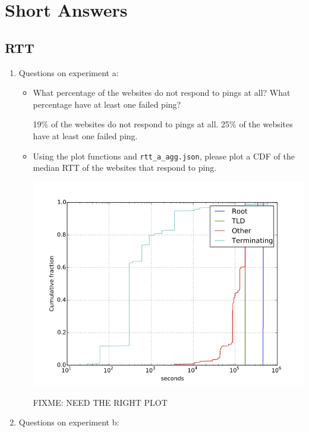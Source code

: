\documentclass[10pt]{article}
\begin{document}
\section*{Short Answers}

\subsection*{RTT}

\begin{enumerate}
\item Questions on experiment a:

\begin{itemize}
\item What percentage of the websites do not respond to pings at all? What percentage have at least one failed ping?

19\% of the websites do not respond to pings at all. 25\% of the websites have at least one failed ping.

\item Using the plot functions and \texttt{rtt\_a\_agg.json}, please plot a CDF of the median RTT of the websites that respond to ping.

\begin{center}
\includegraphics[scale=0.5]{example_cdf_dns_ttl}
\end{center}
FIXME: NEED THE RIGHT PLOT

\end{itemize}

\item Questions on experiment b:


\end{enumerate}
\end{document}
